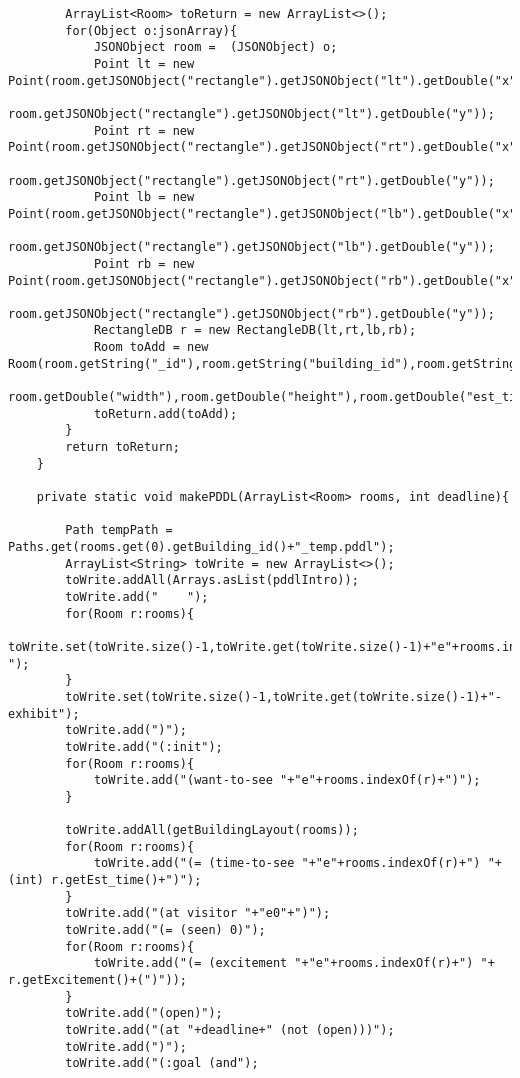 \documentclass{article}
\begin{document}
\begin{lstlisting}
        ArrayList<Room> toReturn = new ArrayList<>();
        for(Object o:jsonArray){
            JSONObject room =  (JSONObject) o;
            Point lt = new Point(room.getJSONObject("rectangle").getJSONObject("lt").getDouble("x"),
                    room.getJSONObject("rectangle").getJSONObject("lt").getDouble("y"));
            Point rt = new Point(room.getJSONObject("rectangle").getJSONObject("rt").getDouble("x"),
                    room.getJSONObject("rectangle").getJSONObject("rt").getDouble("y"));
            Point lb = new Point(room.getJSONObject("rectangle").getJSONObject("lb").getDouble("x"),
                    room.getJSONObject("rectangle").getJSONObject("lb").getDouble("y"));
            Point rb = new Point(room.getJSONObject("rectangle").getJSONObject("rb").getDouble("x"),
                    room.getJSONObject("rectangle").getJSONObject("rb").getDouble("y"));
            RectangleDB r = new RectangleDB(lt,rt,lb,rb);
            Room toAdd = new Room(room.getString("_id"),room.getString("building_id"),room.getString("name"),r,
                    room.getDouble("width"),room.getDouble("height"),room.getDouble("est_time"),room.getInt("excitement"));
            toReturn.add(toAdd);
        }
        return toReturn;
    }

    private static void makePDDL(ArrayList<Room> rooms, int deadline){

        Path tempPath = Paths.get(rooms.get(0).getBuilding_id()+"_temp.pddl");
        ArrayList<String> toWrite = new ArrayList<>();
        toWrite.addAll(Arrays.asList(pddlIntro));
        toWrite.add("    ");
        for(Room r:rooms){
            toWrite.set(toWrite.size()-1,toWrite.get(toWrite.size()-1)+"e"+rooms.indexOf(r)+" ");
        }
        toWrite.set(toWrite.size()-1,toWrite.get(toWrite.size()-1)+"- exhibit");
        toWrite.add(")");
        toWrite.add("(:init");
        for(Room r:rooms){
            toWrite.add("(want-to-see "+"e"+rooms.indexOf(r)+")");
        }

        toWrite.addAll(getBuildingLayout(rooms));
        for(Room r:rooms){
            toWrite.add("(= (time-to-see "+"e"+rooms.indexOf(r)+") "+(int) r.getEst_time()+")");
        }
        toWrite.add("(at visitor "+"e0"+")");
        toWrite.add("(= (seen) 0)");
        for(Room r:rooms){
            toWrite.add("(= (excitement "+"e"+rooms.indexOf(r)+") "+ r.getExcitement()+(")"));
        }
        toWrite.add("(open)");
        toWrite.add("(at "+deadline+" (not (open)))");
        toWrite.add(")");
        toWrite.add("(:goal (and");


\end{lstlisting}
\end{document}

